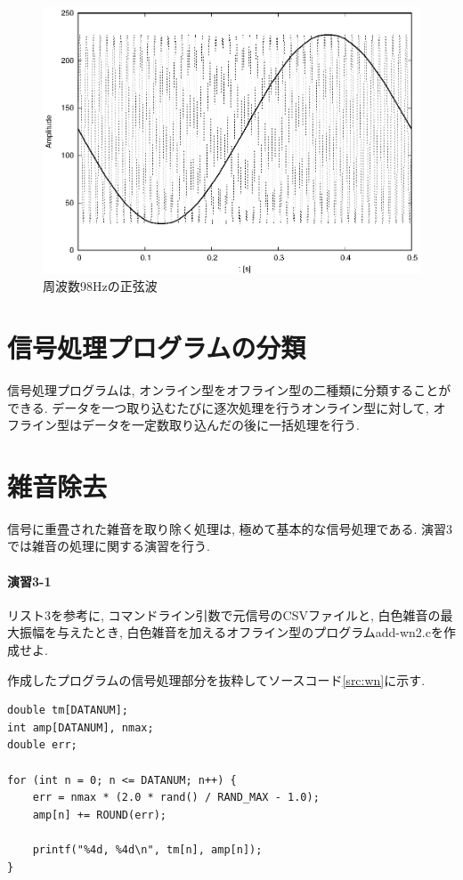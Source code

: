 \documentclass[titlepage]{jsarticle}
\begin{document}
        \begin{figure}[ht]
            \centering
            \includegraphics[width=12cm]{images/sin98.eps}
            \caption{周波数98Hzの正弦波}
            \label{fig:sin98}
        \end{figure}

\section{信号処理プログラムの分類}
    信号処理プログラムは, オンライン型をオフライン型の二種類に分類することができる.
    データを一つ取り込むたびに逐次処理を行うオンライン型に対して,
    オフライン型はデータを一定数取り込んだの後に一括処理を行う.

\section{雑音除去}
    信号に重畳された雑音を取り除く処理は, 極めて基本的な信号処理である.
    演習3では雑音の処理に関する演習を行う.

    \paragraph{演習3-1} リスト3を参考に, コマンドライン引数で元信号のCSVファイルと,
    白色雑音の最大振幅を与えたとき, 白色雑音を加えるオフライン型のプログラムadd-wn2.cを作成せよ.

        作成したプログラムの信号処理部分を抜粋してソースコード\ref{src:wn}に示す.

        \begin{lstlisting}[caption=add-wn2.c, label=src:wn]
double tm[DATANUM];
int amp[DATANUM], nmax;
double err;

for (int n = 0; n <= DATANUM; n++) {
    err = nmax * (2.0 * rand() / RAND_MAX - 1.0);
    amp[n] += ROUND(err);

    printf("%4d, %4d\n", tm[n], amp[n]);
}
        \end{lstlisting}
\end{document}
